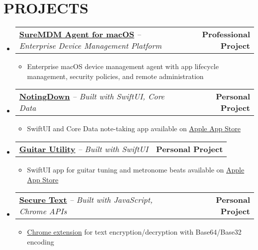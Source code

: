 \documentclass[letterpaper,11pt]{article}
\makeatletter
\newcommand{\resumeItem}[1]{
  \item\small{
    {#1 \vspace{-2pt}}
  }
}
\newcommand{\resumeProjectHeading}[2]{
    \item
    \begin{tabular*}{1.001\textwidth}{l@{\extracolsep{\fill}}r}
      \small#1 & \textbf{\small #2}\\
    \end{tabular*}\vspace{-7pt}
}
\newcommand{\resumeSubHeadingListStart}{\begin{itemize}[leftmargin=0.0in, label={}]}
\newcommand{\resumeSubHeadingListEnd}{\end{itemize}}
\newcommand{\resumeItemListStart}{\begin{itemize}}
\newcommand{\resumeItemListEnd}{\end{itemize}\vspace{-5pt}}
\makeatother
\begin{document}
\section{PROJECTS}
    \vspace{1pt}
    \resumeSubHeadingListStart
        \resumeProjectHeading
            {\href{https://www.42gears.com/products/mobile-device-management/suremdm-agent-for-macos-past-releases/}{\textbf{\large{\underline{SureMDM Agent for macOS}}}} \hspace{0.1cm} 
            \large{\textit{– Enterprise Device Management Platform}}}{Professional Project}
            \resumeItemListStart
                \resumeItem{\normalsize{Enterprise macOS device management agent with app lifecycle management, security policies, and remote administration}}
            \resumeItemListEnd 
            \vspace{-9pt}

        \resumeProjectHeading
            {\href{https://github.com/sachin6174/NotingDown}{\textbf{\large{\underline{NotingDown}}}} \hspace{0.1cm} 
            \large{\textit{– Built with SwiftUI, Core Data}}}{Personal Project}
            \resumeItemListStart
                \resumeItem{\normalsize{SwiftUI and Core Data note-taking app available on \href{https://apps.apple.com/us/app/notingdown/id123456789}{Apple App Store}}}
            \resumeItemListEnd 
            \vspace{-9pt}

        \resumeProjectHeading
            {\href{https://github.com/sachin6174/Guitar-Utility}{\textbf{\large{\underline{Guitar Utility}}}} \hspace{0.1cm} 
            \large{\textit{– Built with SwiftUI}}}{Personal Project}
            \resumeItemListStart
                \resumeItem{\normalsize{SwiftUI app for guitar tuning and metronome beats available on \href{https://apps.apple.com/us/app/guitar-utility/id6751228342}{Apple App Store}}}
            \resumeItemListEnd 
            \vspace{-9pt}

        \resumeProjectHeading
            {\href{https://github.com/sachin6174/secure-text-chrome-extension}{\textbf{\large{\underline{Secure Text}}}} \hspace{0.1cm} 
            \large{\textit{– Built with JavaScript, Chrome APIs}}}{Personal Project}
            \resumeItemListStart
                \resumeItem{\normalsize{\href{https://chromewebstore.google.com/detail/secure-text/ankgchfieiimiijhlcjcongijapefmei}{Chrome extension} for text encryption/decryption with Base64/Base32 encoding}}
            \resumeItemListEnd 
            \vspace{-9pt}
    \resumeSubHeadingListEnd
\end{document}
